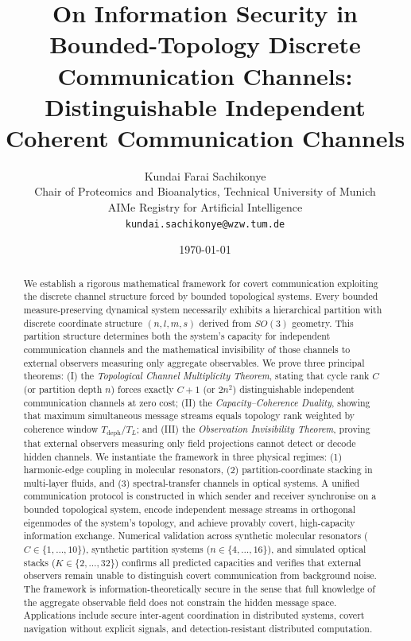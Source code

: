 \documentclass[11pt,twocolumn,a4paper]{article}
\title{\textbf{On Information Security in Bounded-Topology Discrete Communication Channels:\\[3pt] Distinguishable Independent Coherent Communication Channels}}
\author{Kundai Farai Sachikonye\\
\small Chair of Proteomics and Bioanalytics, Technical University of Munich\\
\small AIMe Registry for Artificial Intelligence\\
\small \texttt{kundai.sachikonye@wzw.tum.de}}
\date{\today}
\theoremstyle{definition}
\begin{document}
\maketitle

\begin{abstract}
We establish a rigorous mathematical framework for covert communication exploiting the discrete channel structure forced by bounded topological systems. Every bounded measure-preserving dynamical system necessarily exhibits a hierarchical partition with discrete coordinate structure $(n,l,m,s)$ derived from $SO(3)$ geometry. This partition structure determines both the system's capacity for independent communication channels and the mathematical invisibility of those channels to external observers measuring only aggregate observables. We prove three principal theorems: (I) the \emph{Topological Channel Multiplicity Theorem}, stating that cycle rank $C$ (or partition depth $n$) forces exactly $C+1$ (or $2n^2$) distinguishable independent communication channels at zero cost; (II) the \emph{Capacity--Coherence Duality}, showing that maximum simultaneous message streams equals topology rank weighted by coherence window $T_\mathrm{deph}/T_L$; and (III) the \emph{Observation Invisibility Theorem}, proving that external observers measuring only field projections cannot detect or decode hidden channels. We instantiate the framework in three physical regimes: (1) harmonic-edge coupling in molecular resonators, (2) partition-coordinate stacking in multi-layer fluids, and (3) spectral-transfer channels in optical systems. A unified communication protocol is constructed in which sender and receiver synchronise on a bounded topological system, encode independent message streams in orthogonal eigenmodes of the system's topology, and achieve provably covert, high-capacity information exchange. Numerical validation across synthetic molecular resonators ($C \in \{1,\dots,10\}$), synthetic partition systems ($n \in \{4,\dots,16\}$), and simulated optical stacks ($K \in \{2,\dots,32\}$) confirms all predicted capacities and verifies that external observers remain unable to distinguish covert communication from background noise. The framework is information-theoretically secure in the sense that full knowledge of the aggregate observable field does not constrain the hidden message space. Applications include secure inter-agent coordination in distributed systems, covert navigation without explicit signals, and detection-resistant distributed computation.
\end{abstract}
\end{document}
